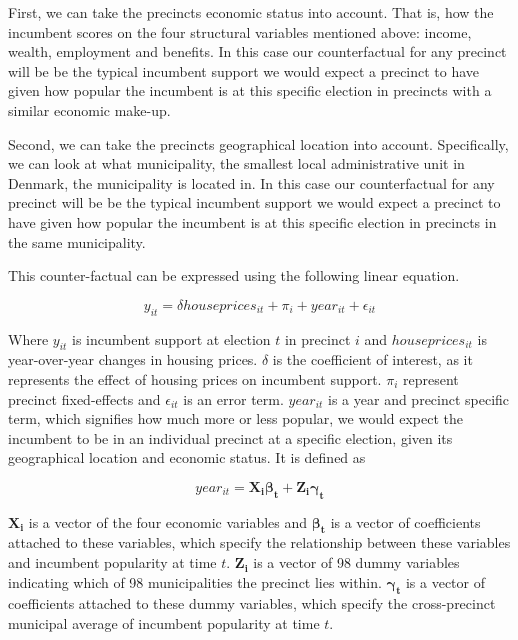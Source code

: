 \documentclass[12pt,a4paper]{article}
\begin{document}
	First, we can take the precincts economic status into account. That is, how the incumbent scores on the four structural variables mentioned above: income, wealth, employment and benefits. In this case our counterfactual for any precinct will be be the typical incumbent support we would expect a precinct to have given how popular the incumbent is at this specific election in precincts with a similar economic make-up.
	
	Second, we can take the precincts geographical location into account. Specifically, we can look at what municipality,  the smallest local administrative unit in Denmark, the municipality is located in. In this case our counterfactual for any precinct will be be the typical incumbent support we would expect a precinct to have given how popular the incumbent is at this specific election in precincts in the same municipality.
	
	This counter-factual can be expressed using the following linear equation.
	
	\begin{equation}
	y_{it}= \delta houseprices_{it} + \pi_i + year_{it} + \epsilon_{it}
	\end{equation}
	
	Where $y_{it}$ is incumbent support at election $t$ in precinct $i$ and $houseprices_{it}$ is year-over-year changes in housing prices. $\delta$ is the coefficient of interest, as it represents the effect of housing prices on incumbent support.  $\pi_i$ represent precinct fixed-effects and $\epsilon_{it}$ is an error term. $year_{it}$ is a year and precinct specific term, which signifies how much more or less popular, we would expect the incumbent to be in an individual precinct at a specific election, given its geographical location and economic status. It is defined as
	
	\begin{equation}
	year_{it}=\mathbf{X_i\beta_t + Z_i\gamma_t}
	\end{equation}
	
	$ \mathbf{X_i}$ is a vector of the four economic variables and $\mathbf{\beta_t}$ is a vector of coefficients attached to these variables, which specify the relationship between these variables and incumbent popularity at time $t$. $\mathbf{Z_i}$ is a vector of 98 dummy variables indicating which of 98 municipalities the precinct lies within. $\mathbf{\gamma_t}$ is a vector of coefficients attached to these dummy variables, which specify the cross-precinct municipal average of incumbent popularity at time $t$.
	
\end{document}
